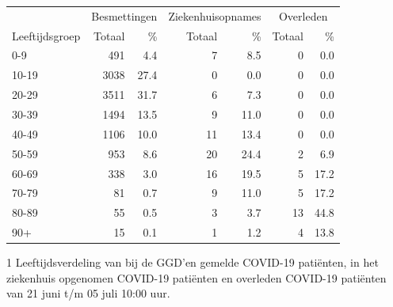 \documentclass[
  english,
  man,floatsintext]{apa6}
\begin{document}
\begin{table}
\centering\begingroup\fontsize{11}{13}\selectfont

\begin{threeparttable}
\begin{tabular}{lrrrrrr}
\toprule
\multicolumn{1}{c}{ } & \multicolumn{2}{c}{Besmettingen} & \multicolumn{2}{c}{Ziekenhuisopnames} & \multicolumn{2}{c}{Overleden} \\
\cmidrule(l{3pt}r{3pt}){2-3} \cmidrule(l{3pt}r{3pt}){4-5} \cmidrule(l{3pt}r{3pt}){6-7}
Leeftijdsgroep & Totaal & \% & Totaal & \% & Totaal & \%\\
\midrule
0-9 & 491 & 4.4 & 7 & 8.5 & 0 & 0.0\\
10-19 & 3038 & 27.4 & 0 & 0.0 & 0 & 0.0\\
20-29 & 3511 & 31.7 & 6 & 7.3 & 0 & 0.0\\
30-39 & 1494 & 13.5 & 9 & 11.0 & 0 & 0.0\\
40-49 & 1106 & 10.0 & 11 & 13.4 & 0 & 0.0\\
50-59 & 953 & 8.6 & 20 & 24.4 & 2 & 6.9\\
60-69 & 338 & 3.0 & 16 & 19.5 & 5 & 17.2\\
70-79 & 81 & 0.7 & 9 & 11.0 & 5 & 17.2\\
80-89 & 55 & 0.5 & 3 & 3.7 & 13 & 44.8\\
90+ & 15 & 0.1 & 1 & 1.2 & 4 & 13.8\\
\bottomrule
\end{tabular}
\begin{tablenotes}
\item[1] Leeftijdsverdeling van bij de GGD’en gemelde COVID-19 patiënten, in het ziekenhuis opgenomen COVID-19 patiënten en overleden COVID-19 patiënten van 21 juni t/m 05 juli 10:00 uur.
\end{tablenotes}
\end{threeparttable}
\endgroup{}
\end{table}

\newpage
\end{document}
